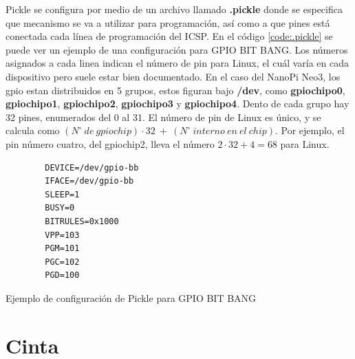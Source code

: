 \documentclass[12pt,letterpaper]{article}     %
\begin{document}
Pickle se configura por medio de un archivo llamado \textbf{.pickle} donde se especifica que mecanismo se va a utilizar 
para programación, así como a que pines está conectada cada línea de programación del ICSP. En el código 
\ref{code:.pickle} se puede ver un ejemplo de una configuración para GPIO BIT BANG.
Los números asignados a cada linea indican el número de pin para Linux, el cuál varía en cada dispositivo pero
suele estar bien documentado. En el caso del NanoPi Neo3, los gpio estan distribuidos en 5 grupos, estos figuran 
bajo \textbf{/dev}, como \textbf{gpiochipo0}, \textbf{gpiochipo1}, \textbf{gpiochipo2}, \textbf{gpiochipo3} y
\textbf{gpiochipo4}. Dento de cada grupo hay 32 pines, enumerados del 0 al 31. El número de pin de Linux es único,
y se calcula como $(N^\circ\ de\ gpiochip)\cdot32\ +\ (N^\circ\ interno\ en\ el\ chip)$. Por ejemplo, el pin número
cuatro, del gpiochip2, lleva el número $2\cdot32+4=68$ para Linux.

\begin{codigo}[!h]
	\begin{lstlisting}
		DEVICE=/dev/gpio-bb
		IFACE=/dev/gpio-bb
		SLEEP=1
		BUSY=0
		BITRULES=0x1000
		VPP=103
		PGM=101
		PGC=102
		PGD=100
	\end{lstlisting}
	\caption{Ejemplo de configuración de Pickle para GPIO BIT BANG}
	\label{code:.pickle}
\end{codigo}

\clearpage
\section{Cinta}
\end{document}
